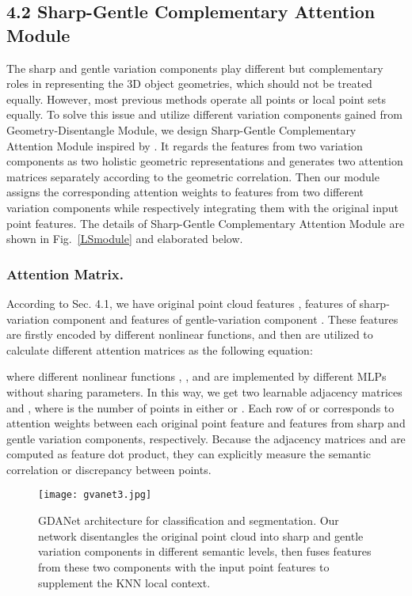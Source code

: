 \documentclass[letterpaper]{article} \usepackage{aaai21}  \usepackage{times}  \usepackage{helvet} \usepackage{courier}  \usepackage[hyphens]{url}  \usepackage{graphicx} \urlstyle{rm} \def\UrlFont{\rm}  \usepackage{natbib}  \usepackage{caption} \frenchspacing  \setlength{\pdfpagewidth}{8.5in}  \setlength{\pdfpageheight}{11in}  \usepackage{color}
\begin{document}
\subsection{4.2 Sharp-Gentle \hspace{-0.4mm}Complementary\hspace{-0.5mm} Attention \hspace{-0.5mm}Module}
The sharp and gentle variation components play different but complementary roles in representing the 3D object geometries, which should not be treated equally. However, most previous methods operate all points or local point sets equally. To solve this issue and utilize different variation components gained from Geometry-Disentangle Module, we design Sharp-Gentle Complementary Attention Module inspired by \cite{NIPS2017_7181,nonlocal}. It regards the features from two variation components as two holistic geometric representations and generates two attention matrices separately according to the geometric correlation. Then our module assigns the corresponding attention weights to features from two different variation components while respectively integrating them with the original input point features. The details of Sharp-Gentle Complementary Attention Module are shown in Fig.~\ref{LSmodule} and elaborated below. 

\subsubsection{Attention Matrix.}
According to Sec. 4.1, we have original point cloud features , features of sharp-variation component  and features of gentle-variation component . 
These features are firstly encoded by different nonlinear functions, and then are utilized to calculate different attention matrices as the following equation:

where different nonlinear functions , ,  and  are implemented by different MLPs without sharing parameters. In this way, we get two learnable adjacency matrices  and , where  is the number of points in either  or . Each row of  or  corresponds to attention weights between each original point feature and features from sharp and gentle variation components, respectively. Because the adjacency matrices  and  are computed as feature dot product, they can explicitly measure the semantic correlation or discrepancy between points.

\begin{figure*}[t]
	\begin{center}
	\texttt{[image: gvanet3.jpg]}
	\end{center}
	
    \setlength{\belowcaptionskip}{0.cm}
	\caption{GDANet architecture for classification and segmentation. Our network disentangles the original point cloud into sharp and gentle variation components in different semantic levels, then fuses features from these two components with the input point features to supplement the KNN local context.}
	\label{FAFNET}
\end{figure*}
\end{document}
